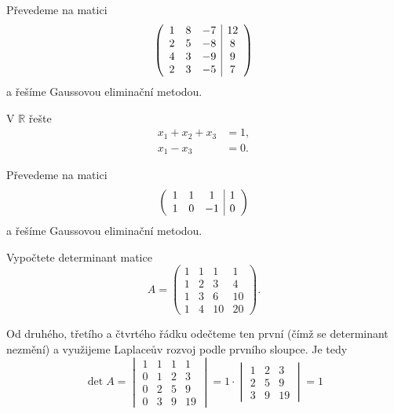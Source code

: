 \begin{reseni}
Převedeme na matici
$$
\left (
\begin{array}{c c c | c }
1 & 8& -7& 12\\
2& 5& -8& 8\\
4& 3& -9& 9\\
2& 3& -5& 7
\end{array}
\right )
$$
a řešíme Gaussovou eliminační metodou.
\end{reseni}

\begin{priklad}
V $\mathbb R$ řešte
\begin{align*}
    x_1+x_2+x_3&=1,\\
    x_1-x_3 &=0.
\end{align*}
\end{priklad}

\begin{reseni}
Převedeme na matici
$$
\left (
\begin{array}{c c c | c }
1 & 1 & 1 & 1\\
1  & 0 &-1  &0
\end{array}
\right )
$$
a řešíme Gaussovou eliminační metodou.
\end{reseni}

\begin{priklad}
Vypočtete determinant matice
$$A=\begin{pmatrix}
    1  &1 &1 &1\\
    1 &2 &3 &4 \\
    1 &3 &6 &10\\
    1 &4 &10 &20
\end{pmatrix}.$$
\end{priklad}

\begin{reseni}
Od druhého, třetího a čtvrtého řádku odečteme ten první (čímž se determinant nezmění)
a využijeme Laplaceův rozvoj podle prvního sloupce. Je tedy
$$\det A = \begin{vmatrix}
    1 &1 &1 &1\\
    0 &1 &2 &3 \\
    0 &2 &5 &9 \\
    0 &3 &9 &19
\end{vmatrix}=1 \cdot \begin{vmatrix}
1 &2 &3 \\
2 &5 &9\\
3 &9 &19
\end{vmatrix}=1$$
\end{reseni}


